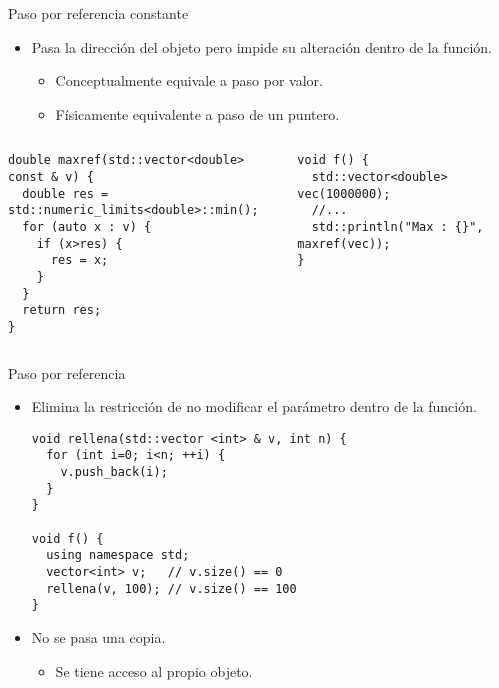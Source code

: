 \begin{frame}[t,fragile]{Paso por referencia constante}
\begin{itemize}
\item Pasa la dirección del objeto pero impide su 
      alteración dentro de la función.
  \begin{itemize}
    \item Conceptualmente equivale a paso por valor.
    \item Físicamente equivalente a paso de un puntero.
  \end{itemize}
\end{itemize}

\begin{columns}[T]

\begin{lstlisting}
double maxref(std::vector<double> const & v) {
  double res = std::numeric_limits<double>::min();
  for (auto x : v) {
    if (x>res) {
      res = x;
    }
  }
  return res;
}
\end{lstlisting}

\begin{lstlisting}
void f() {
  std::vector<double> vec(1000000);
  //...
  std::println("Max : {}", maxref(vec));
}
\end{lstlisting}

\end{columns}
\end{frame}

\begin{frame}[t,fragile]{Paso por referencia}
\begin{itemize}
  \item Elimina la restricción de no modificar el parámetro dentro de la función.
\begin{lstlisting}
void rellena(std::vector <int> & v, int n) {
  for (int i=0; i<n; ++i) {
    v.push_back(i);
  } 
}

void f() {
  using namespace std;
  vector<int> v;   // v.size() == 0
  rellena(v, 100); // v.size() == 100
}
\end{lstlisting}

  \vfill
  \item No se pasa una copia.
    \begin{itemize}
      \item Se tiene acceso al propio objeto.
    \end{itemize}
\end{itemize}
\end{frame}
